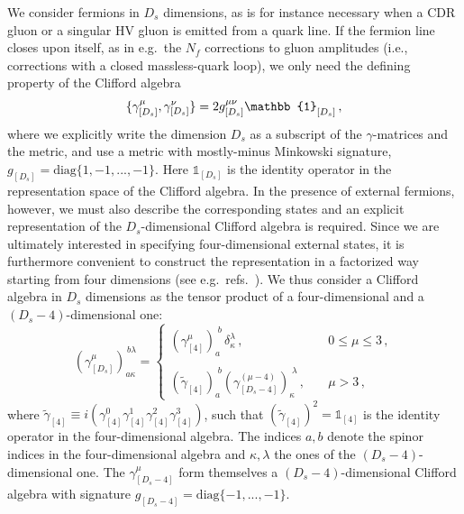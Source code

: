 We consider fermions in $D_s$ dimensions, as is for instance
necessary when a CDR gluon or a singular HV gluon is emitted 
from a quark line. If the fermion line closes upon itself, as in
e.g.~the $N_f$ corrections to gluon amplitudes
(i.e., corrections with a closed massless-quark loop), 
we only need the defining
property of the Clifford algebra
\begin{equation} \label{eqn:defClifford}
\{ \gamma_{[D_s]}^\mu, \gamma_{[D_s]}^\nu \} = 
2 g_{[D_s]}^{\mu\nu}\mathbb{1}_{[D_s]}^{\vphantom{\mu\nu}} \,,
\end{equation}
where we explicitly write the dimension $D_s$
as a subscript of the $\gamma$-matrices and the metric, and
use a metric with mostly-minus Minkowski signature, 
$g_{[D_s]}=\mathrm{diag}\{1, -1 , ... , -1 \}$.
Here $\mathbb{1}_{[D_s]}$ is the identity operator in the representation space of 
the Clifford algebra.
In the presence of external fermions, however, 
we must also describe the corresponding states and
an explicit
representation of the $D_s$-dimensional Clifford algebra is
required. Since we are ultimately interested in specifying
four-dimensional
external states, it is furthermore convenient to construct 
the representation in a factorized way starting from four dimensions
(see e.g.~refs.~\cite{Kreuzer:susylectures,Collins:1984xc}).
We thus consider a Clifford algebra
in $D_s$ dimensions as the tensor product of a
four-dimensional and a $(D_s-4)$-dimensional one:
\begin{equation}\label{eqn:cliffordrecursion}
%
(\gamma_{[D_s]}^\mu)_{a\kappa}^{\,b\lambda}  = \left\{ 
\begin{array}{ll} 
		\left(\gamma_{[4]}^\mu\right)_a^{\;b} \,
		\delta_\kappa^\lambda\,, &\quad  0\le\mu \le 3 \,,\\&\\
		\left(\tilde\gamma_{[4]}\right)_a^{\;b} 
		\left(\gamma_{[D_s-4]}^{(\mu-4)}\right)_\kappa^{\;\lambda}\,, 
        &\quad \mu > 3 \,,
\end{array}
		\right.
%
\end{equation}
where $\tilde\gamma_{[4]}\equiv i(\gamma_{[4]}^0
\gamma_{[4]}^1 \gamma_{[4]}^2 \gamma_{[4]}^3)$, such that 
$(\tilde\gamma_{[4]})^2 =\mathbb{1}_{[4]}$ is the identity
operator
in the four-dimensional algebra.
The indices $a,b$ denote the spinor indices in the
four-dimensional algebra and $\kappa,\lambda$ the ones of the 
$(D_s-4)$-dimensional one.
The $\gamma^\mu_{[D_s-4]}$ form themselves a 
$(D_s-4)$-dimensional Clifford algebra with signature
$g_{[D_s-4]}=\mathrm{diag}\{ -1 , ... , -1 \}$.

